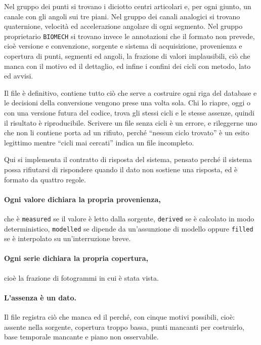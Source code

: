Nel gruppo dei punti si trovano i diciotto centri articolari e, per ogni giunto,
un canale con gli angoli sui tre piani. Nel gruppo dei canali analogici si trovano
quaternione, velocità ed accelerazione angolare di ogni segmento. Nel gruppo
proprietario \texttt{BIOMECH} si trovano invece le annotazioni che il formato non
prevede, cioè versione e convenzione, sorgente e sistema di acquisizione,
provenienza e copertura di punti, segmenti ed angoli, la frazione di valori
implausibili, ciò che manca con il motivo ed il dettaglio, ed infine i confini dei
cicli con metodo, lato ed avvisi.

Il file è definitivo, contiene tutto ciò che serve a costruire ogni riga del
database e le decisioni della conversione vengono prese una volta sola. Chi lo
riapre, oggi o con una versione futura del codice, trova gli stessi cicli e le
stesse assenze, quindi il risultato è riproducibile. Scrivere un file senza cicli
è un errore, e rileggerne uno che non li contiene porta ad un rifiuto, perché
``nessun ciclo trovato'' è un esito legittimo mentre ``cicli mai cercati'' indica
un file incompleto.

Qui si implementa il contratto di risposta del sistema, pensato perché il sistema
possa rifiutarsi di rispondere quando il dato non sostiene una risposta, ed è
formato da quattro regole.

\paragraph{Ogni valore dichiara la propria provenienza,} che è
\texttt{measured} se il valore è letto dalla sorgente, \texttt{derived} se è
calcolato in modo deterministico, \texttt{modelled} se dipende da un'assunzione di
modello oppure \texttt{filled} se è interpolato su un'interruzione breve.

\paragraph{Ogni serie dichiara la propria copertura,} cioè la frazione di
fotogrammi in cui è stata vista.

\paragraph{L'assenza è un dato.} Il file registra ciò che manca ed il perché, con
cinque motivi possibili, cioè: assente nella sorgente, copertura troppo bassa,
punti mancanti per costruirlo, base temporale mancante e piano non osservabile.

